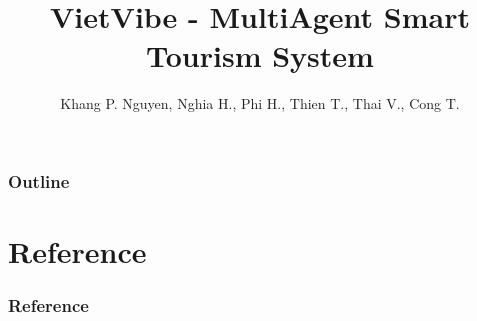\documentclass[aspectratio=169, 10pt]{beamer}
\title[Falcuty of Information Technology]{\large \textbf{VietVibe - MultiAgent Smart Tourism System }}
\author[Khang P. Nguyen, Nghia T. Hoang, Thai Viet, Cong Thanh, Thien T.]{Khang P. Nguyen, Nghia H., Phi H., Thien T., Thai V., Cong T. \inst{1}}
\institute[]{
\inst{1}University of Science - Vietnam National University \\
}
\begin{document}
\begin{frame}
    \titlepage
\end{frame}

\begin{frame}[t, allowframebreaks]
    \frametitle{Outline}
    \tableofcontents
\end{frame}


\section*{Reference}
\begin{frame}[t, allowframebreaks]
\footnotesize
    \frametitle{Reference}
    
\end{frame}
\end{document}
